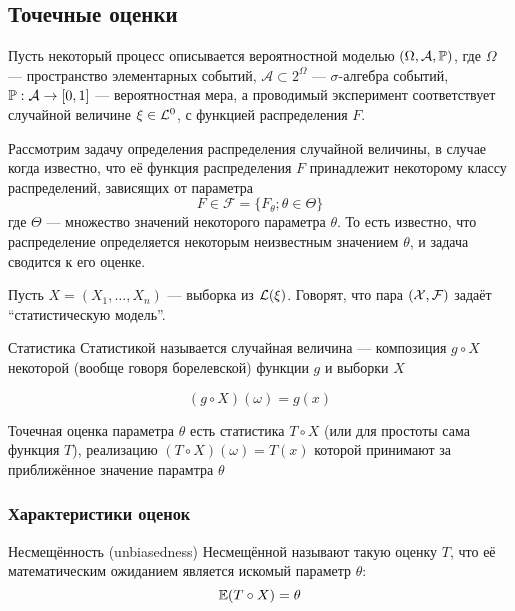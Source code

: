 \subsection{Точечные оценки}

Пусть некоторый процесс
описывается вероятностной моделью $(\Omega, \mathcal A, \mathbb P)$,
где $\Omega$ --- пространство элементарных событий,
$\mathcal A \subset 2^\Omega$ --- $\sigma$-алгебра событий,
$\mathbb P: \mathcal A\to \left[{0, 1}\right]$ --- вероятностная мера,
а проводимый эксперимент соответствует случайной величине $\xi\in\mathcal L^{0}$,
с функцией распределения $F$.

Рассмотрим задачу определения распределения случайной величины,
в случае когда известно,
что её функция распределения $F$
принадлежит некоторому классу распределений,
зависящих от параметра
$$F\in\mathcal F = \{F_\theta; \theta\in\Theta\}$$
где $\Theta$ --- множество значений некоторого параметра $\theta$.
То есть известно,
что распределение определяется некоторым неизвестным значением $\theta$,
и задача сводится к его оценке.

Пусть $X = (X_1, \dotsc, X_n)$ --- выборка из $\mathcal L(\xi)$.
Говорят, что пара $(\mathcal X, \mathcal F)$ задаёт ``статистическую модель''.

\begin{dfn}{Статистика}
Статистикой называется случайная величина
--- композиция $g\circ X$ некоторой
(вообще говоря борелевской) функции $g$ и выборки $X$

$$(g\circ X)(\omega) = g(x)$$
\end{dfn}

\begin{dfn}{Точечная оценка параметра $\theta$}
есть статистика $T\circ X$ (или для простоты сама функция $T$),
реализацию $(T\circ X)(\omega) = T(x)$ которой принимают за приближённое значение парамтра $\theta$
\end{dfn}

\subsubsection{Характеристики оценок}

\begin{dfn}{Несмещённость (unbiasedness)}
Несмещённой называют такую оценку $T$,
что её математическим ожиданием является искомый параметр $\theta$:
$$\mathbb E (T\circ X) = \theta$$

\end{dfn}

